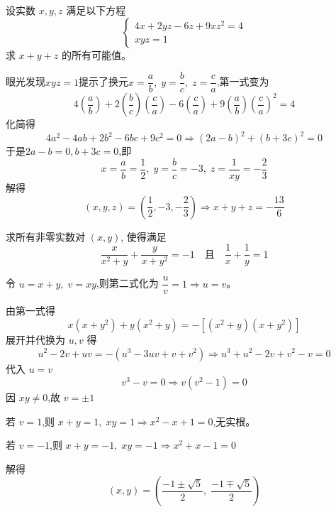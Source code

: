 \begin{questions}
    \question 设实数 $x, y, z$ 满足以下方程
    \[
    \begin{cases}
    4x + 2 y z - 6 z + 9 x z^2 = 4 \\
    x y z = 1
    \end{cases}
    \]
    求 $x + y + z$ 的所有可能值。
    \begin{solution}
        眼光发现$xyz=1$提示了换元$x=\dfrac{a}{b},\;y=\dfrac{b}{c},\;z=\dfrac{c}{a}$,第一式变为
        \[
        4\left(\dfrac{a}{b}\right)+2\left(\dfrac{b}{c}\right)\left(\dfrac{c}{a}\right)-6\left(\dfrac{c}{a}\right)+9\left(\dfrac{a}{b}\right)\left(\dfrac{c}{a}\right)^2=4 
        \]
        化简得
        \[
        4a^2-4ab+2b^2−6bc+9c^2=0 \Rightarrow (2a-b)^2+(b+3c)^2=0
        \]
        于是$2a-b=0,b+3c=0$,即
        \[
        x=\frac{a}{b}=\frac{1}{2},\;y=\frac{b}{c}=-3,\;z=\frac{1}{xy}=-\frac{2}{3}
        \]
        解得
        \[
        (x,y,z)=\left(\frac{1}{2},-3,-\frac{2}{3}\right) \Rightarrow x+y+z = -\frac{13}{6}
        \]
    \end{solution}
    
    \question 求所有非零实数对 $(x, y)$, 使得满足
    \[
    \frac{x}{x^2 + y} + \frac{y}{x + y^2} = -1 \quad \text{且} \quad \frac{1}{x} + \frac{1}{y} = 1
    \]
    \begin{solution}
        令 $u = x + y,\; v = xy$,则第二式化为 $\dfrac{u}{v} = 1 \Rightarrow u = v$。
        
        由第一式得
        \[
        x(x + y^2) + y(x^2 + y) = -[(x^2 + y)(x + y^2)]
        \]
        展开并代换为 $u, v$ 得
        \[
        u^2 - 2v + uv = - (u^3 - 3uv + v + v^2)
        \Rightarrow u^3 + u^2 - 2v + v^2 - v = 0
        \]
        代入 $u = v$
        \[
        v^3 - v = 0 \Rightarrow v(v^2 - 1) = 0
        \]
        因 $xy \ne 0$,故 $v = \pm1$
        
        若 $v = 1$,则 $x + y = 1,\; xy = 1 \Rightarrow x^2 - x + 1 = 0$,无实根。
        
        若 $v = -1$,则 $x + y = -1,\; xy = -1 \Rightarrow x^2 + x -1 = 0$
        
        解得
        \[
        (x, y) = \left(\frac{-1 \pm \sqrt{5}}{2},\; \frac{-1 \mp \sqrt{5}}{2} \right)
        \]
    \end{solution}


\end{questions}
